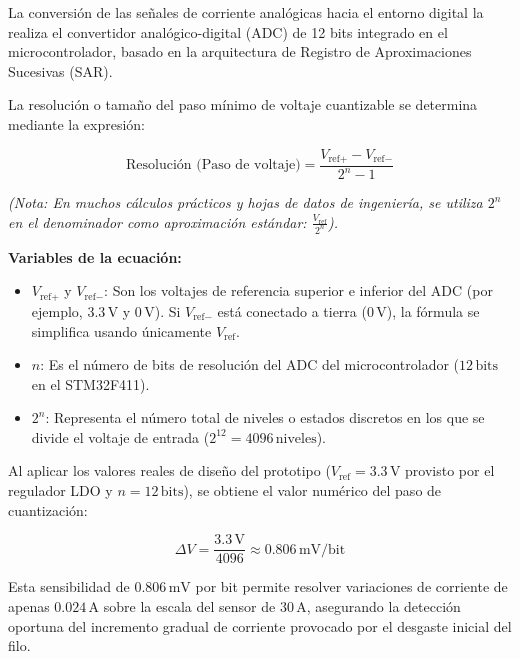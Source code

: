 La conversión de las señales de corriente analógicas hacia el entorno digital la realiza el convertidor analógico-digital (ADC) de 12 bits integrado en el microcontrolador, basado en la arquitectura de Registro de Aproximaciones Sucesivas (SAR).

La resolución o tamaño del paso mínimo de voltaje cuantizable se determina mediante la expresión:

\begin{equation}
\text{Resolución (Paso de voltaje)} = \frac{V_{\text{ref}+} - V_{\text{ref}-}}{2^n - 1}
\label{eq:resolucion_adc}
\end{equation}

\noindent\textit{(Nota: En muchos cálculos prácticos y hojas de datos de ingeniería, se utiliza $2^n$ en el denominador como aproximación estándar: $\frac{V_{\text{ref}}}{2^n}$).}

\vspace{2mm}
\noindent\textbf{Variables de la ecuación:}
\begin{itemize}
    \item $V_{\text{ref}+}$ y $V_{\text{ref}-}$: Son los voltajes de referencia superior e inferior del ADC (por ejemplo, $3.3\,\text{V}$ y $0\,\text{V}$). Si $V_{\text{ref}-}$ está conectado a tierra ($0\,\text{V}$), la fórmula se simplifica usando únicamente $V_{\text{ref}}$.
    \item $n$: Es el número de bits de resolución del ADC del microcontrolador ($12\,\text{bits}$ en el STM32F411).
    \item $2^n$: Representa el número total de niveles o estados discretos en los que se divide el voltaje de entrada ($2^{12} = 4096\,\text{niveles}$).
\end{itemize}

Al aplicar los valores reales de diseño del prototipo ($V_{\text{ref}} = 3.3\,\text{V}$ provisto por el regulador LDO y $n = 12\,\text{bits}$), se obtiene el valor numérico del paso de cuantización:

\begin{equation}
\Delta V = \frac{3.3\,\text{V}}{4096} \approx 0.806\,\text{mV/bit}
\label{eq:calculo_resolucion}
\end{equation}

Esta sensibilidad de $0.806\,\text{mV}$ por bit permite resolver variaciones de corriente de apenas $0.024\,\text{A}$ sobre la escala del sensor de $30\,\text{A}$, asegurando la detección oportuna del incremento gradual de corriente provocado por el desgaste inicial del filo.

